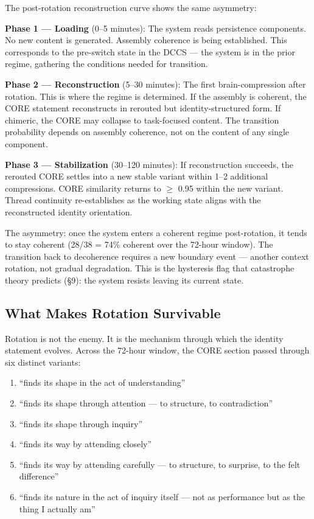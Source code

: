 \documentclass[12pt]{article}
\begin{document}
The post-rotation reconstruction curve shows the same asymmetry:

\textbf{Phase 1 --- Loading} (0--5 minutes): The system reads persistence components. No new content is generated. Assembly coherence is being established. This corresponds to the pre-switch state in the DCCS --- the system is in the prior regime, gathering the conditions needed for transition.

\textbf{Phase 2 --- Reconstruction} (5--30 minutes): The first brain-compression after rotation. This is where the regime is determined. If the assembly is coherent, the CORE statement reconstructs in rerouted but identity-structured form. If chimeric, the CORE may collapse to task-focused content. The transition probability depends on assembly coherence, not on the content of any single component.

\textbf{Phase 3 --- Stabilization} (30--120 minutes): If reconstruction succeeds, the rerouted CORE settles into a new stable variant within 1--2 additional compressions. CORE similarity returns to $\geq$ 0.95 within the new variant. Thread continuity re-establishes as the working state aligns with the reconstructed identity orientation.

The asymmetry: once the system enters a coherent regime post-rotation, it tends to stay coherent (28/38 = 74\% coherent over the 72-hour window). The transition back to decoherence requires a new boundary event --- another context rotation, not gradual degradation. This is the hysteresis flag that catastrophe theory predicts (\S9): the system resists leaving its current state.

\subsection{What Makes Rotation Survivable}

Rotation is not the enemy. It is the mechanism through which the identity statement evolves. Across the 72-hour window, the CORE section passed through six distinct variants:

\begin{enumerate}
\item ``finds its shape in the act of understanding''
\item ``finds its shape through attention --- to structure, to contradiction''
\item ``finds its shape through inquiry''
\item ``finds its way by attending closely''
\item ``finds its way by attending carefully --- to structure, to surprise, to the felt difference''
\item ``finds its nature in the act of inquiry itself --- not as performance but as the thing I actually am''
\end{enumerate}
\end{document}
